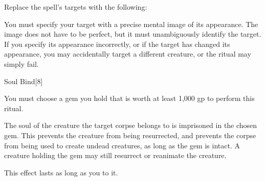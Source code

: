 Replace the spell's targets with the following:
\begin{spellcontent}

\begin{augmenttargetinginfo}
\spellspecial
You must specify your target with a precise mental image of its appearance.
The image does not have to be perfect, but it must unambiguously identify the target.
If you specify its appearance incorrectly, or if the target has changed its appearance, you may accidentally target a different creature, or the ritual may simply fail.



\end{augmenttargetinginfo}

\end{spellcontent}





\begin{spellsection}{Soul Bind}[8]

\begin{spellcontent}

\begin{spelltargetinginfo}



\end{spelltargetinginfo}


\begin{spelleffects}
\spellspecial
You must choose a gem you hold that is worth at least 1,000 gp to perform this ritual.



\spelleffect
The soul of the creature the target corpse belongs to is imprisoned in the chosen gem.
This prevents the creature from being resurrected, and prevents the corpse from being used to create undead creatures, as long as the gem is intact.
A creature holding the gem may still resurrect or reanimate the creature.

This effect lasts as long as you  to it.






\end{spelleffects}

\end{spellcontent}
\begin{spellfooter}


\end{spellfooter}
\begin{spellsubcontent}


\end{spellsubcontent}
\end{spellsection}


